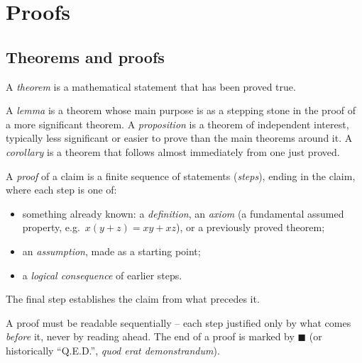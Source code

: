 \newpage
\section{Proofs}

\subsection{Theorems and proofs}
\label{sec:3-1}

\begin{definition}[Theorem]
A \emph{theorem} is a mathematical statement that has been proved true.
\end{definition}

\begin{definition}
A \emph{lemma} is a theorem whose main purpose is as a stepping stone in the proof of a more significant theorem. A \emph{proposition} is a theorem of independent interest, typically less significant or easier to prove than the main theorems around it. A \emph{corollary} is a theorem that follows almost immediately from one just proved.
\end{definition}

\begin{definition}[Proof]
A \emph{proof} of a claim is a finite sequence of statements (\emph{steps}), ending in the claim, where each step is one of:
\begin{itemize}
    \item something already known: a \emph{definition}, an \emph{axiom} (a fundamental assumed property, e.g.\ $x(y+z)=xy+xz$), or a previously proved theorem;
    \item an \emph{assumption}, made as a starting point;
    \item a \emph{logical consequence} of earlier steps.
\end{itemize}
The final step establishes the claim from what precedes it.
\end{definition}

\begin{note}[Verifiability]
A proof must be readable sequentially -- each step justified only by what comes \emph{before} it, never by reading ahead. The end of a proof is marked by $\blacksquare$ (or historically ``Q.E.D.'', \emph{quod erat demonstrandum}).
\end{note}

